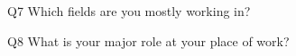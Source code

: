 \begin{description}%
\item{Q7} Which fields are you mostly working in?%
\item{Q8} What is your major role at your place of work?%
\end{description}%
